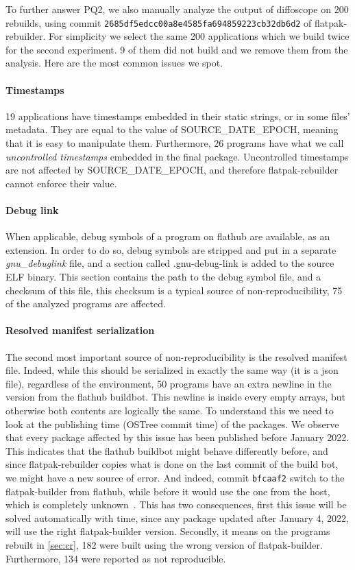 \documentclass[a4paper,11pt,oneside]{report}
\theoremstyle{definition}
\newcommand{\sysname}{flatpak-rebuilder\xspace}
\newcommand{\fh}{flathub\xspace}
\newcommand{\fb}{flatpak-builder\xspace}
\newcommand{\sde}{SOURCE\_DATE\_EPOCH\xspace}
\newcommand{\fhbb}{flathub buildbot\xspace}
\newcommand{\dfc}{diffoscope\xspace}
\newcommand{\ot}{OSTree\xspace}
\begin{document}
\noindent
To further answer PQ2, we also manually analyze the output of \dfc on 200 rebuilds,
using commit \verb|2685df5edcc00a8e4585fa694859223cb32db6d2| of \sysname. For
simplicity we select the same 200 applications which we build twice for the
second experiment. 9 of them did not build and we remove them from the analysis.
Here are the most common issues we spot.

\paragraph*{Timestamps}
19 applications have timestamps embedded in their static strings, or in some files'
metadata. They are equal to the value of \sde, meaning that it is easy to
manipulate them. Furthermore, 26 programs have what we call \emph{uncontrolled
timestamps} embedded in the final package. Uncontrolled timestamps are not
affected by \sde, and therefore \sysname cannot enforce their value.

\paragraph*{Debug link}
When applicable, debug symbols of a program on \fh are available, as an
extension. In order to do so, debug symbols are stripped and put in a separate
\emph{gnu\_debuglink} file, and a section called .gnu-debug-link is added to
the source ELF binary. This section contains the path to the debug symbol file,
and a checksum of this file, this checksum is a typical source of
non-reproducibility, 75 of the analyzed programs are affected.

\paragraph*{Resolved manifest serialization}
The second most important source of non-reproducibility is the resolved
manifest file. Indeed, while this should be serialized in exactly the same way
(it is a json file), regardless of the environment, 50 programs have an extra
newline in the version from the \fhbb. This newline is inside every empty
arrays, but otherwise both contents are logically the same. To understand this
we need to look at the publishing time (\ot commit time) of the packages. We
observe that every package affected by this issue has been published before
January 2022. This indicates that the \fhbb might behave differently before,
and since \sysname copies what is done on the last commit of the build bot, we
might have a new source of error. And indeed, commit \verb|bfcaaf2| switch to
the \fb from \fh, while before it would use the one from the host, which is
completely unknown~\cite{gh:ptdr}. This has two consequences, first this issue
will be solved automatically with time, since any package updated after January
4, 2022, will use the right \fb version. Secondly, it means on the programs
rebuilt in \autoref{sec:cr}, 182 were built using the wrong version of \fb.
Furthermore, 134 were reported as not reproducible.
\end{document}
